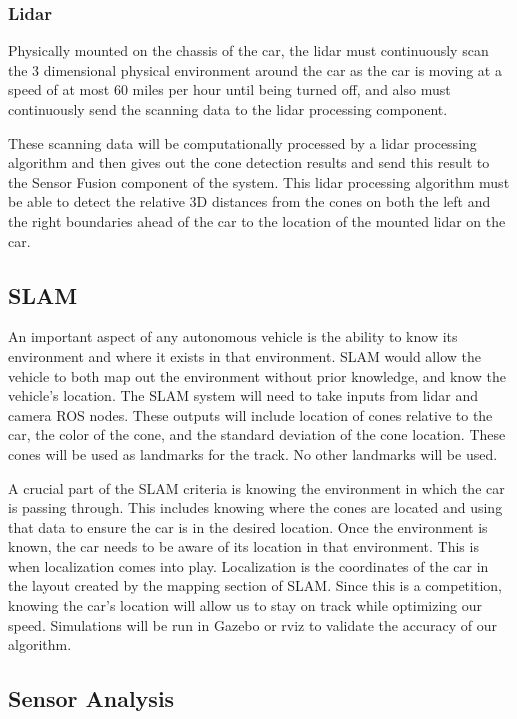 \documentclass[10pt, onecolumn, draftclsnofoot, letterpaper,compsoc]{IEEEtran}
\begin{document}
\subsubsection{Lidar}
Physically mounted on the chassis of the car, the lidar must continuously scan the 3 dimensional physical environment around the car as the car is moving at a speed of at most 60 miles per hour until being turned off, and also must continuously send the scanning data to the lidar processing component. 

These scanning data will be computationally processed by a lidar processing algorithm and then gives out the cone detection results and send this result to the Sensor Fusion component of the system. This lidar processing algorithm must be able to detect the relative 3D distances from the cones on both the left and the right boundaries ahead of the car to the location of the mounted lidar on the car.

\subsection{SLAM}
An important aspect of any autonomous vehicle is the ability to know its environment and where it exists in that environment. SLAM would allow the vehicle to both map out the environment without prior knowledge, and know the vehicle's location. The SLAM system will need to take inputs from lidar and camera ROS nodes. These outputs will include location of cones relative to the car, the color of the cone, and the standard deviation of the cone location. These cones will be used as landmarks for the track. No other landmarks will be used.

A crucial part of the SLAM criteria is knowing the environment in which the car is passing through. This includes knowing where the cones are located and using that data to ensure the car is in the desired location. Once the environment is known, the car needs to be aware of its location in that environment. This is when localization comes into play. Localization is the coordinates of the car in the layout created by the mapping section of SLAM. Since this is a competition, knowing the car's location will allow us to stay on track while optimizing our speed. Simulations will be run in Gazebo or rviz to validate the accuracy of our algorithm. 



\subsection{Sensor Analysis}
\end{document}
